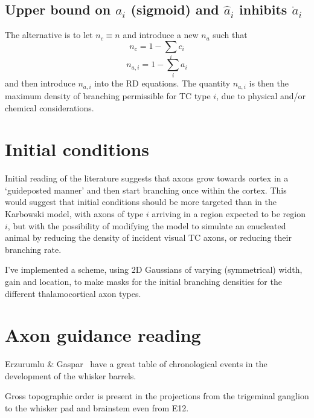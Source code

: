 \documentclass[11pt, a4paper]{article}
\begin{document}
\subsection{Upper bound on $a_i$ (sigmoid) and $\hat{a}_i$ inhibits $\dot{a}_i$}

The alternative is to let $n_c \equiv n$ and introduce a new $n_a$
such that
%
\begin{equation}
n_c = 1 - \sum_i c_i
\end{equation}
%
\begin{equation}
n_{a,i} = 1 - \sum_i a_i
\end{equation}
%
and then introduce $n_{a,i}$ into the RD equations. The quantity
$n_{a,i}$ is then the maximum density of branching permissible for TC
type $i$, due to physical and/or chemical considerations.

\section{Initial conditions}

Initial reading of the literature suggests that axons grow towards
cortex in a `guideposted manner' and then start branching once within
the cortex. This would suggest that initial conditions should be more
targeted than in the Karbowski model, with axons of type $i$ arriving
in a region expected to be region $i$, but with the possibility of
modifying the model to simulate an enucleated animal by reducing the
density of incident visual TC axons, or reducing their branching rate.

I've implemented a scheme, using 2D Gaussians of varying (symmetrical)
width, gain and location, to make masks for the initial branching
densities for the different thalamocortical axon types.

\section{Axon guidance reading}

Erzurumlu \& Gaspar~\cite{erzurumlu_development_2012} have a great
table of chronological events in the development of the whisker
barrels.

Gross topographic order is present in the projections from the
trigeminal ganglion to the whisker pad and brainstem even from E12.
\end{document}
